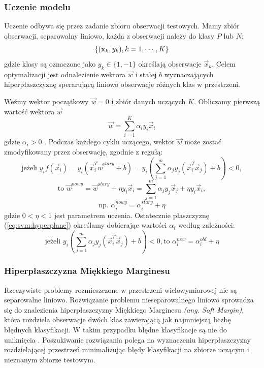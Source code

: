 \documentclass[a4paper,12pt,twoside,openany]{report}
\newcommand{\ang}[1]{\textit{(ang. #1)}}
\newcommand{\Eq}[1]{(\ref{#1})}
\begin{document}
\subsubsection{Uczenie modelu}
Uczenie odbywa się przez zadanie zbioru obserwacji testowych. 
Mamy zbiór obserwacji, separowalny liniowo, każda z obserwacji należy do klasy $P$ lub $N$:
\begin{displaymath}
	\{ ({\bf x}_k, y_k), k=1,\cdots,K \} 
\end{displaymath}
gdzie klasy są oznaczone jako $y_k \in \{1,-1\}$ określają obserwacje $\vec{x}_k$.
Celem optymalizacji jest odnalezienie wektora $\vec{w}$ i stałej $b$ wyznaczających hiperpłaszczyznę
sperarującą liniowo obserwacje różnych klas w przestrzeni. 

Weźmy wektor początkowy $\vec{w} = 0$ i zbiór danych uczących $K$.
Obliczamy pierwszą wartość wektora $\vec{w}$
\begin{equation}\label{eq:svm:hyperplane}
	{\vec{w}}=\sum_{i=1}^K \alpha_i y_i {\vec{x}}_i
\end{equation}
gdzie $\alpha_i>0$ \cite{Mittal2016}.
Podczas każdego cyklu uczącego, wektor $\vec{w}$ może zostać zmodyfikowany przez obserwację, 
zgodnie z regułą:
\begin{equation}
	\mbox{jeżeli } y_i f({\vec{x}}_i)=y_i ({\vec{x}}_i^T{\vec{w}}^{stary}+b)
	=y_i\left(\sum_{j=1}^m \alpha_j y_j({\vec{x}}_i^T{\vec{x}}_j)+b\right)<0,
\end{equation}
\begin{equation}
	\mbox{to } {\vec{w}}^{nowy}={\vec{w}}^{stary}+\eta y_i {\vec{x}}_i
	=\sum_{j=1}^{m} \alpha_j y_j\vec{x}_j +\eta y_i {\vec{x}}_i,
\end{equation}
\begin{equation}
	\mbox{np. }
	\alpha_i^{nowy}=\alpha_i^{stary}+\eta
\end{equation}
gdzie $0 < \eta < 1$ jest parametrem uczenia.
Ostatecznie płaszczyznę \Eq{eq:svm:hyperplane} określamy dobierając wartości $\alpha_i$ według zależności: 
\begin{equation}
	\mbox{jeżeli } y_i\left(\sum_{j=1}^m \alpha_j y_j({\vec{x}}_i^T\vec{x}_j)+b\right)<0,
	\mbox{to } \alpha_i^{new}=\alpha_i^{old}+\eta 
\end{equation}

\subsubsection{Hiperpłaszczyzna Miękkiego Marginesu}
Rzeczywiste problemy rozmieszczone w przestrzeni wielowymiarowej nie są separowalne liniowo. 
Rozwiązanie problemu nieseparowalnego liniowo sprowadza się do znalezienia hiperpłaszczyzny Miękkiego Marginesu \ang{Soft Margin}, 
która rozdziela obserwacje dwóch klas zawierającą jak najmniejszą liczbę błędnych klasyfikacji.
W takim przypadku błędne klasyfikacje są nie do uniknięcia \cite{Dellepiane2015}.
Poszukiwanie rozwiązania polega na wyznaczeniu hiperpłaszczyzny rozdzielającej przestrzeń 
minimalizując błędy klasyfikacji na zbiorze uczącym i nieznanym zbiorze testowym.
\end{document}
